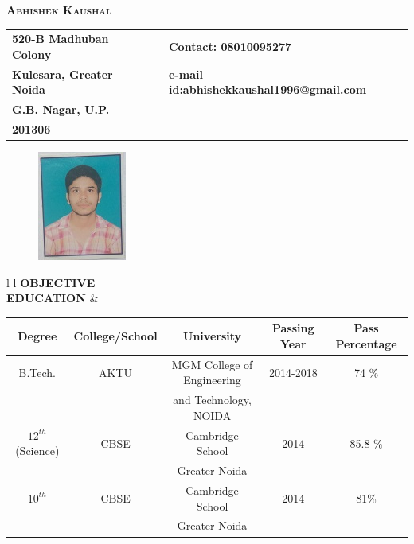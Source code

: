 \documentclass{article}
\begin{document}
\begin{center}
\textsc{\textbf{\huge{Abhishek Kaushal}}}
\end{center}
\noindent\makebox[\linewidth]{\rule{17cm}{1.8pt}}

\begin{table}[h!]
  \begin{center}
    \begin{tabular}{l p{4cm} l} 
      \textbf{520-B Madhuban Colony} &  & \textbf{Contact: 08010095277}       \\ 
	\textbf{Kulesara, Greater Noida} &  & \textbf{e-mail id:abhishekkaushal1996@gmail.com}\\
	\textbf{G.B. Nagar, U.P.}&  &\\
	\textbf{201306}
    \end{tabular}
  \end{center}
\end{table}

\begin{figure}[h]
\advance\leftskip-68mm
\noindent
\includegraphics[scale=0.7,right]{IMG_20171204_155357.jpg}
\end{figure}

\begin{table}[h!]
  \begin{center}
    \begin{tabular}{l  l} 
      \textbf{\Large{OBJECTIVE}}\\ \textbf{\Large{EDUCATION}} & 
	
          \begin{tabular}{| c | c | c | c | c |} 
		\hline
     	 	\textbf{Degree} & \textbf{College/School} & \textbf{University} & \textbf{Passing Year} & \textbf{Pass Percentage}\\
		\hline
		B.Tech. & AKTU  & MGM College of Engineering & 2014-2018 & 74 \% \\
		 && and Technology, NOIDA &&\\
		\hline
		$12^{th}$(Science) & CBSE  & Cambridge School  & 2014 & 85.8 \% \\
		&&Greater Noida &&\\
		\hline
		$10^{th}$ & CBSE  & Cambridge School  & 2014 &  81\% \\
		&&Greater Noida &&\\
		\hline
   	 \end{tabular}
 	 
    \end{tabular}
  \end{center}
\end{table}
\end{document}
